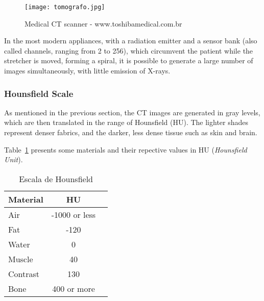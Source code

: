 \begin{figure}[!htb]
\centering
\texttt{[image: tomografo.jpg]}
\caption{Medical CT scanner - www.toshibamedical.com.br}
\end{figure}


In the most modern appliances, with a radiation emitter and a sensor bank (also called channels, ranging from 2 to 256), which circumvent the patient while the stretcher is moved, forming a spiral, it is possible to generate a large number of images simultaneously, with little emission of X-rays.

\subsubsection{Hounsfield Scale}

As mentioned in the previous section, the CT images are generated in gray levels, which are then translated in the range of Hounsfield (HU). The lighter shades represent denser fabrics, and the darker, less dense tissue such as skin and brain. 


Table~\ref{tab:escala_hounsfield} presents some materials and their repective values in HU (\textit{Hounsfield Unit}).

\begin{table}[h]
\centering
\caption{Escala de Hounsfield}
\begin{tabular}{lcc}\\
\hline %
Material & HU\\
\hline
\hline
Air & -1000 or less\\
Fat & -120\\
Water & 0\\
Muscle & 40\\
Contrast & 130\\
Bone & 400 or more\\
\hline
\end{tabular}
\label{tab:escala_hounsfield}
\end{table}


